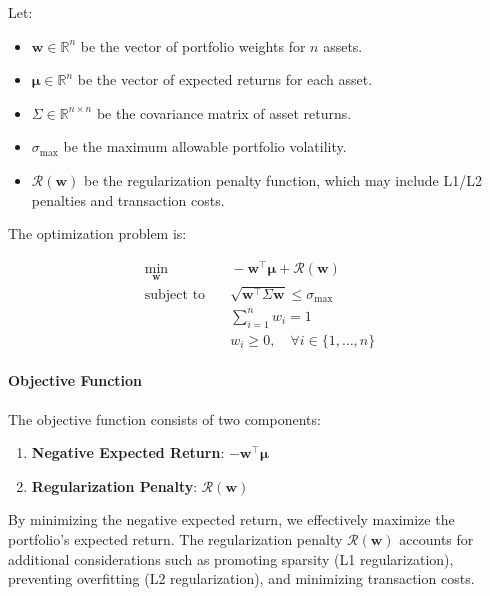 Let:

\begin{itemize}
    \item \( \mathbf{w} \in \mathbb{R}^n \) be the vector of portfolio weights for \( n \) assets.
    \item \( \boldsymbol{\mu} \in \mathbb{R}^n \) be the vector of expected returns for each asset.
    \item \( \Sigma \in \mathbb{R}^{n \times n} \) be the covariance matrix of asset returns.
    \item \( \sigma_{\text{max}} \) be the maximum allowable portfolio volatility.
    \item \( \mathcal{R}(\mathbf{w}) \) be the regularization penalty function, which may include L1/L2 penalties and transaction costs.
\end{itemize}

The optimization problem is:

\[
\begin{aligned}
\min_{\mathbf{w}} & \quad -\mathbf{w}^\top \boldsymbol{\mu} + \mathcal{R}(\mathbf{w}) \\
\text{subject to} & \quad \sqrt{\mathbf{w}^\top \Sigma \mathbf{w}} \leq \sigma_{\text{max}} \\
& \quad \sum_{i=1}^n w_i = 1 \\
& \quad w_i \geq 0, \quad \forall i \in \{1, \dots, n\}
\end{aligned}
\]

\paragraph{Objective Function}

The objective function consists of two components:

\begin{enumerate}
    \item \textbf{Negative Expected Return}: \( -\mathbf{w}^\top \boldsymbol{\mu} \)
    \item \textbf{Regularization Penalty}: \( \mathcal{R}(\mathbf{w}) \)
\end{enumerate}

By minimizing the negative expected return, we effectively maximize the portfolio's expected return. The regularization penalty \( \mathcal{R}(\mathbf{w}) \) accounts for additional considerations such as promoting sparsity (L1 regularization), preventing overfitting (L2 regularization), and minimizing transaction costs.

